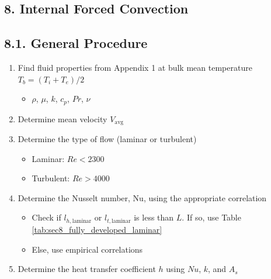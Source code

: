 \documentclass[10pt]{article}
\begin{document}
\begin{multicols*}{2}
\section*{8. Internal Forced Convection}
\subsection*{8.1. General Procedure}
\begin{enumerate}
    \item Find fluid properties from Appendix 1 at bulk mean temperature $T_b = (T_i + T_e)/2$
    \begin{itemize}
        \item $\rho$, $\mu$, $k$, $c_p$, $Pr$, $\nu$
    \end{itemize}
    \item Determine mean velocity $V_{\text{avg}}$
    \item Determine the type of flow (laminar or turbulent)
    \begin{itemize}
        \item Laminar: $Re < 2300$
        \item Turbulent: $Re > 4000$
    \end{itemize}
    \item Determine the Nusselt number, Nu, using the appropriate correlation
    \begin{itemize}
        \item Check if $l_{h, \text{laminar}}$ or $l_{t, \text{laminar}}$ is less than $L$. If so, use Table \ref{tab:sec8_fully_developed_laminar} 
        \item Else, use empirical correlations
    \end{itemize}
    \item Determine the heat transfer coefficient $h$ using $Nu$, $k$, and $A_s$
\end{enumerate}


\end{multicols*}
\end{document}
